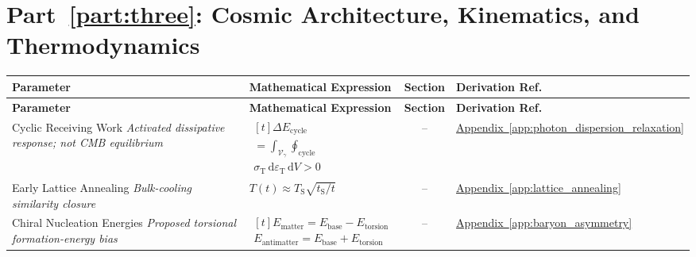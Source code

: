 \par\ifdim\dimexpr\pagegoal-\pagetotal\relax<12\baselineskip\newpage\fi
\section*{Part~\ref{part:three}: Cosmic Architecture, Kinematics, and Thermodynamics}

\vspace{0.5cm}
\noindent
\begin{longtable}{@{} p{4.5cm} p{6cm} c p{4cm} @{}}
\toprule
\textbf{Parameter} & \textbf{Mathematical Expression} & \textbf{Section} & \textbf{Derivation Ref.} \\
\midrule
\endfirsthead
\toprule
\textbf{Parameter} & \textbf{Mathematical Expression} & \textbf{Section} & \textbf{Derivation Ref.} \\
\midrule
\endhead

{\raggedright Cyclic Receiving Work \newline \textit{Activated dissipative response; not CMB equilibrium}\par} & {\raggedright $\begin{gathered}[t]\Delta E_{\mathrm{cycle}} \\ =\int_{\mathcal V_\gamma}\oint_{\mathrm{cycle}} \\ \sigma_{\mathrm T}\,\mathrm d\varepsilon_{\mathrm T}\,\mathrm dV>0\end{gathered}$\par} & -- & {\raggedright \hyperref[app:photon_dispersion_relaxation]{Appendix~\ref*{app:photon_dispersion_relaxation}}\par} \\

{\raggedright Early Lattice Annealing \newline \textit{Bulk-cooling similarity closure}\par} & {\raggedright $T(t)\approx T_{\mathrm S}\sqrt{t_{\mathrm S}/t}$\par} & -- & {\raggedright \hyperref[app:lattice_annealing]{Appendix~\ref*{app:lattice_annealing}}\par} \\

{\raggedright Chiral Nucleation Energies \newline \textit{Proposed torsional formation-energy bias}\par} & {\raggedright $\begin{gathered}[t]E_{\mathrm{matter}}=E_{\mathrm{base}}-E_{\mathrm{torsion}} \\ E_{\mathrm{antimatter}}=E_{\mathrm{base}}+E_{\mathrm{torsion}}\end{gathered}$\par} & -- & {\raggedright \hyperref[app:baryon_asymmetry]{Appendix~\ref*{app:baryon_asymmetry}}\par} \\


\end{longtable}
